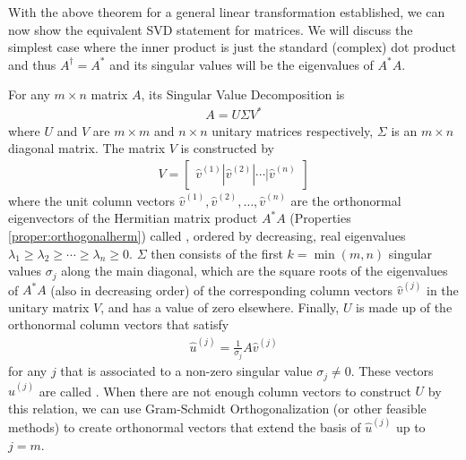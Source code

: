 With the above theorem for a general linear transformation established, we can now show the equivalent SVD statement for matrices. We will discuss the simplest case where the inner product is just the standard (complex) dot product and thus $A^\dag = A^*$ and its singular values will be the eigenvalues of $A^*A$.
\begin{thm}
\label{thm:SVD}
For any $m \times n$ matrix $A$, its Singular Value Decomposition is
\begin{align}
A = U\Sigma V^*
\end{align}
where $U$ and $V$ are $m \times m$ and $n \times n$ unitary matrices respectively, $\Sigma$ is an $m \times n$ diagonal matrix. The matrix $V$ is constructed by
\begin{align}
V = 
\begin{bmatrix}
\hat{v}^{(1)} | \hat{v}^{(2)} | \cdots | \hat{v}^{(n)}
\end{bmatrix}
\end{align}
where the unit column vectors $\hat{v}^{(1)}, \hat{v}^{(2)}, \ldots, \hat{v}^{(n)}$ are the orthonormal eigenvectors of the Hermitian matrix product $A^*A$ (Properties \ref{proper:orthogonalherm}) called , ordered by decreasing, real eigenvalues $\lambda_1 \geq \lambda_2 \geq \cdots \geq \lambda_n \geq 0$. $\Sigma$ then consists of the first $k = \min(m,n)$ singular values $\sigma_j$ along the main diagonal, which are the square roots of the eigenvalues of $A^*A$ (also in decreasing order) of the corresponding column vectors $\hat{v}^{(j)}$ in the unitary matrix $V$, and has a value of zero elsewhere. Finally, $U$ is made up of the orthonormal column vectors that satisfy
\begin{align}
\hat{u}^{(j)} = \frac{1}{\sigma_j} A\hat{v}^{(j)}
\end{align}
for any $j$ that is associated to a non-zero singular value $\sigma_j \neq 0$. These vectors $\hat{u}^{(j)}$ are called . When there are not enough column vectors to construct $U$ by this relation, we can use Gram-Schmidt Orthogonalization (or other feasible methods) to create orthonormal vectors that extend the basis of $\hat{u}^{(j)}$ up to $j = m$.
\end{thm}
